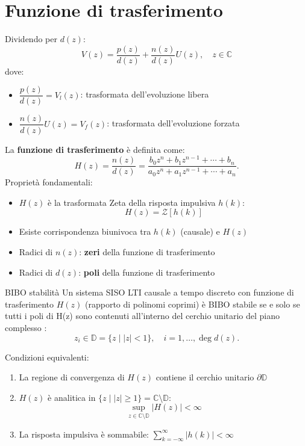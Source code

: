 \documentclass{article}
\theoremstyle{definition}
\begin{document}
\section{Funzione di trasferimento}
Dividendo per \(d(z)\):
\[
V(z) = \frac{p(z)}{d(z)} + \frac{n(z)}{d(z)} U(z), \quad z \in \mathbb{C}
\]
dove:
\begin{itemize}
	\item \(\dfrac{p(z)}{d(z)} = V_l(z)\): trasformata dell'evoluzione libera
	\item \(\dfrac{n(z)}{d(z)} U(z) = V_f(z)\): trasformata dell'evoluzione forzata
\end{itemize}
La \textbf{funzione di trasferimento} è definita come:
\[
H(z) = \frac{n(z)}{d(z)} = \frac{b_0 z^n + b_1 z^{n-1} + \cdots + b_n}{a_0 z^n + a_1 z^{n-1} + \cdots + a_n}.
\]
Proprietà fondamentali:
\begin{itemize}
	\item \(H(z)\) è la trasformata Zeta della risposta impulsiva \(h(k)\): 
	\[
	H(z) = \mathcal{Z}[h(k)]
	\]
	\item Esiste corrispondenza biunivoca tra \(h(k)\) (causale) e \(H(z)\)
	\item Radici di \(n(z)\): \textbf{zeri} della funzione di trasferimento
	\item Radici di \(d(z)\): \textbf{poli} della funzione di trasferimento
\end{itemize}

\begin{teo}{BIBO stabilità}{}
	Un sistema SISO LTI causale a tempo discreto con funzione di trasferimento \(H(z)\) (rapporto di polinomi coprimi) è BIBO stabile se e solo se tutti i poli di H(z) sono contenuti all'interno del cerchio unitario del piano complesso  :
	\[
 z_i \in \mathbb{D} = \{z \mid |z| < 1\}, \quad i = 1,\ldots,\deg d(z).
	\]
\end{teo}
Condizioni equivalenti:
\begin{enumerate}
	\item La regione di convergenza di \(H(z)\) contiene il cerchio unitario \(\partial\mathbb{D}\)
	\item \(H(z)\) è analitica in \(\{z \mid |z| \geq 1\} = \mathbb{C}\setminus\mathbb{D}\):
	\[
	\sup_{z \in \mathbb{C}\setminus\mathbb{D}} |H(z)| < \infty
	\]
	\item La risposta impulsiva è sommabile: \(\sum_{k=-\infty}^{\infty} |h(k)| < \infty\)
\end{enumerate}
\end{document}

